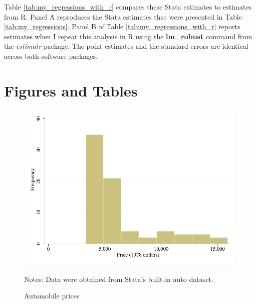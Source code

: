 \documentclass[12pt]{article}
\begin{document}
Table \ref{tab:my_regressions_with_r} compares these Stata estimates to estimates from R. Panel A reproduces the Stata estimates that were presented in Table \ref{tab:my_regressions}.  Panel B of Table \ref{tab:my_regressions_with_r} reports estimates when I repeat this analysis in R using the \textbf{lm\_robust} command from the \textit{estimatr} package. The point estimates and the standard errors are identical across both software packages.

\clearpage
\section{Figures and Tables}


\begin{figure}[ht]
\caption{Automobile prices}\label{fig:price_histogram}
\begin{center}
{\includegraphics[width=1\textwidth]{./figures/price_histogram.pdf}}
\end{center}
\footnotesize {Notes: Data were obtained from Stata's built-in auto dataset.}
\end{figure}
\clearpage





\end{document}
